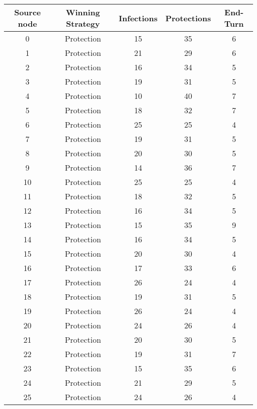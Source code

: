 \documentclass[results.tex]{subfiles}
\begin{document}
\begin{center}
  \begin{tabular}{| c || c | c | c | c |}
    \hline
    {\bfseries Source node} & {\bfseries Winning Strategy} & {\bfseries Infections} & {\bfseries Protections} & {\bfseries End-Turn} \\  %
    \hline\hline
    0 & Protection & 15 & 35 & 6 \\ 
    \hline
    1 & Protection & 21 & 29 & 6 \\ 
    \hline
    2 & Protection & 16 & 34 & 5 \\ 
    \hline
    3 & Protection & 19 & 31 & 5 \\ 
    \hline
    4 & Protection & 10 & 40 & 7 \\ 
    \hline
    5 & Protection & 18 & 32 & 7 \\ 
    \hline
    6 & Protection & 25 & 25 & 4 \\ 
    \hline
    7 & Protection & 19 & 31 & 5 \\ 
    \hline
    8 & Protection & 20 & 30 & 5 \\ 
    \hline
    9 & Protection & 14 & 36 & 7 \\ 
    \hline
    10 & Protection & 25 & 25 & 4 \\ 
    \hline
    11 & Protection & 18 & 32 & 5 \\ 
    \hline
    12 & Protection & 16 & 34 & 5 \\ 
    \hline
    13 & Protection & 15 & 35 & 9 \\ 
    \hline
    14 & Protection & 16 & 34 & 5 \\ 
    \hline
    15 & Protection & 20 & 30 & 4 \\ 
    \hline
    16 & Protection & 17 & 33 & 6 \\ 
    \hline
    17 & Protection & 26 & 24 & 4 \\ 
    \hline
    18 & Protection & 19 & 31 & 5 \\ 
    \hline
    19 & Protection & 26 & 24 & 4 \\ 
    \hline
    20 & Protection & 24 & 26 & 4 \\ 
    \hline
    21 & Protection & 20 & 30 & 5 \\ 
    \hline
    22 & Protection & 19 & 31 & 7 \\ 
    \hline
    23 & Protection & 15 & 35 & 6 \\ 
    \hline
    24 & Protection & 21 & 29 & 5 \\ 
    \hline
    25 & Protection & 24 & 26 & 4 \\ 

\end{tabular}
\end{center}
\end{document}
